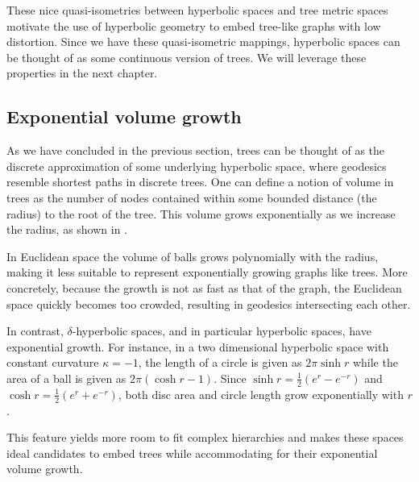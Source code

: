 These nice quasi-isometries between hyperbolic spaces and tree metric spaces motivate the use of hyperbolic geometry to embed tree-like graphs with low distortion. Since we have these quasi-isometric mappings, hyperbolic spaces can be thought of as some continuous version of trees. We will leverage these properties in the next chapter. 

\subsection{Exponential volume growth}\label{sec:expGrowth}
As we have concluded in the previous section, trees can be thought of as the discrete approximation of some underlying hyperbolic space, where geodesics resemble shortest paths in discrete trees. One can define a notion of volume in trees as the number of nodes contained within some bounded distance (the radius) to the root of the tree. This volume grows exponentially as we increase the radius, as shown in .



In Euclidean space the volume of balls grows polynomially with the radius, making it less suitable to represent exponentially growing graphs like trees. More concretely, because the growth is not as fast as that of the graph, the Euclidean space quickly becomes too crowded, resulting in geodesics intersecting each other.

In contrast, $\delta$-hyperbolic spaces, and in particular hyperbolic spaces, have exponential growth. For instance, in a two dimensional hyperbolic space with constant curvature $\kappa = -1$, the length of a circle is given as $2\pi \sinh r$ while the area of a ball is given as $2\pi(\cosh r - 1)$. Since $\sinh r = \frac{1}{2} (e^r - e^{-r})$ and $\cosh r = \frac{1}{2} (e^r + e^{-r})$, both disc area and circle length grow exponentially with $r$. 

This feature yields more room to fit complex hierarchies and makes these spaces ideal candidates to embed trees while accommodating for their exponential volume growth. 